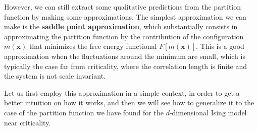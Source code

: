However, we can still extract some qualitative predictions from the partition function by making some approximations. The simplest approximation we can make is the \textbf{saddle point approximation}, which substantially consists in approximating the partition function by the contribution of the configuration \(m(\mathbf{x})\) that minimizes the free energy functional \(F[m(\mathbf{x})]\). This is a good approximation when the fluctuations around the minimum are small, which is typically the case far from criticality, where the correlation length is finite and the system is not scale invariant.

Let us first employ this approximation in a simple context, in order to get a better intuition on how it works, and then we will see how to generalize it to the case of the partition function we have found for the \(d\)-dimensional Ising model near criticality.

